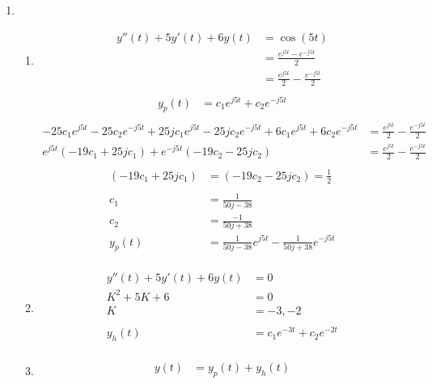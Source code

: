\documentclass[10pt,a4paper, margin=1in]{article}
\begin{document}
\begin{enumerate}
\item %
    \begin{enumerate}
    \item %
    \begin{align*}
        y''(t) + 5y'(t) + 6y(t) & = \cos(5t)\\
        & = \frac{e^{j5t} - e^{-j5t}}{2}\\
        & = \frac{e^{j5t}}{2} - \frac{e^{-j5t}}{2}\\
    \end{align*}
    \begin{align*}
        y_p(t) & = c_1e^{j5t} + c_2e^{-j5t}\\
    \end{align*}
    \begin{align*}
        -25c_1e^{j5t} - 25c_2e^{-j5t} + 25jc_1e^{j5t} - 25jc_2e^{-j5t} + 6c_1e^{j5t} + 6c_2e^{-j5t} & = \frac{e^{j5t}}{2} - \frac{e^{-j5t}}{2}\\
        e^{j5t} \left(-19c_1 + 25jc_1\right) + e^{-j5t} \left(-19c_2 - 25jc_2\right) & = \frac{e^{j5t}}{2} - \frac{e^{-j5t}}{2}\\
    \end{align*}
    \begin{align*}
        \left(-19c_1 + 25jc_1\right) & = \left(-19c_2 - 25jc_2\right) = \frac{1}{2}\\
        & \\
        c_1 & = \frac{1}{50j - 38} \\
        c_2 & = \frac{-1}{50j + 38} \\
        y_p(t) & = \frac{1}{50j - 38}e^{j5t} - \frac{1}{50j + 38}e^{-j5t}\\
    \end{align*}
    \item %
    \begin{align*}
        y''(t) + 5y'(t) + 6y(t) & = 0\\
        K^2 + 5K + 6 & = 0\\
        K & = -3, -2\\
        & \\
        y_h(t) & = c_1e^{-3t} + c_2e^{-2t}\\
    \end{align*}
	\item %
    \begin{align*}
        y(t) & = y_p(t) + y_h(t)\\

\end{align*}
\end{enumerate}
\end{enumerate}
\end{document}
